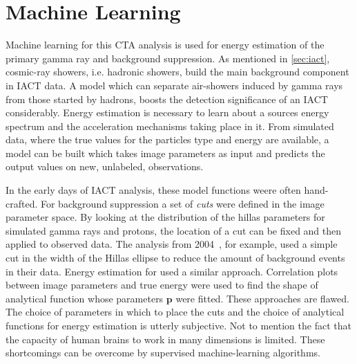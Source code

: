 \newcommand{\mbf}[1]{\mathbf{#1}}
\newcommand{\yhat}{\hat{y}}
\newcommand{\ghat}{\hat{g}}
\newcommand{\data}{\mathbf{X}}
\newcommand{\truth}{\mathbf{y}}
\newcommand{\traindata}{\mathbf{X}_{\text{train}}}
\newcommand{\testdata}{\mathbf{X}_{\text{test}}}
\newcommand{\trainlabel}{\mathbf{y}_{\text{train}}}
\newcommand{\testlabel}{\mathbf{y}_{\text{test}}}
\newcommand{\column}{\mathbf{x}}
\newcommand{\prediction}{\hat{\mathbf{{y}}}}
\chapter{Machine Learning}
\label{ch:ml}
Machine learning for this CTA analysis is used for energy estimation of the primary gamma ray and background suppression.
As mentioned in \cref{sec:iact}, cosmic-ray showers, i.e. hadronic showers, build the main 
background component in IACT data. A model which can separate air-showers induced by gamma rays from those started by hadrons,
boosts the detection significance of an IACT considerably. 
Energy estimation is necessary to learn about a sources energy spectrum and the acceleration mechanisms taking place in it.
From simulated data, where the true values for the particles type and energy are available, a model can be built 
which takes image parameters as input and predicts the output values on new, unlabeled, observations. 

In the early days of IACT analysis, these model functions weere often hand-crafted.
For background suppression a set of \emph{cuts} were defined in the image parameter space. 
By looking at the distribution of the hillas parameters for simulated gamma rays and protons, the location of a cut can be 
fixed and then applied to observed data. 
The \hegra analysis from 2004~\cite{hegra-crab-data}, for example, used a simple cut in the width of the Hillas ellipse to reduce the 
amount of background events in their data. 
Energy estimation for \hegra used a similar approach. Correlation plots between image parameters and true energy were used 
to find the shape of analytical function whose parameters $\mathbf{p}$ were fitted.
These approaches are flawed. The choice of parameters in which to place the cuts and the choice of analytical functions for energy 
estimation is utterly subjective. Not to mention the fact that the capacity of human brains to work in many dimensions is limited.
These shortcomings can be overcome by supervised machine-learning algorithms.

